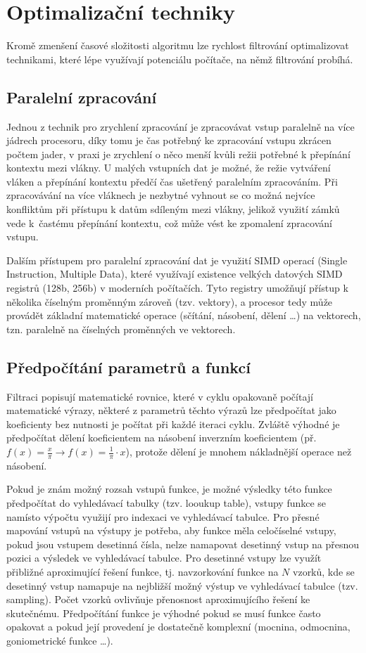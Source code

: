 \section{Optimalizační techniky}
\label{sec:design:optimalization}
Kromě zmenšení časové složitosti algoritmu lze rychlost filtrování optimalizovat technikami, které lépe využívají potenciálu počítače, na němž filtrování probíhá.

\subsection*{Paralelní zpracování}
Jednou z technik pro zrychlení zpracování je zpracovávat vstup paralelně na více jádrech procesoru, díky tomu je čas potřebný ke zpracování vstupu zkrácen počtem jader, v praxi je zrychlení o něco menší kvůli režii potřebné k přepínání kontextu mezi vlákny. U malých vstupních dat je možné, že režie vytváření vláken a přepínání kontextu předčí čas ušetřený paralelním zpracováním. Při zpracovávání na více vláknech je nezbytné vyhnout se co možná nejvíce konfliktům při přístupu k datům sdíleným mezi vlákny, jelikož využití zámků vede k~častému přepínání kontextu, což může vést ke zpomalení zpracování vstupu.

Dalším přístupem pro paralelní zpracování dat je využití SIMD operací (Single Instruction, Multiple Data), které využívají existence velkých datových SIMD registrů (128b, 256b) v moderních počítačích. Tyto registry umožňují přístup k několika číselným proměnným zároveň (tzv. vektory), a procesor tedy může provádět základní matematické operace (sčítání, násobení, dělení \dots) na vektorech, tzn. paralelně na číselných proměnných ve vektorech. 

\subsection*{Předpočítání parametrů a funkcí}
Filtraci popisují matematické rovnice, které v cyklu opakovaně počítají matematické výrazy, některé z parametrů těchto výrazů lze předpočítat jako koeficienty bez nutnosti je počítat při každé iteraci cyklu. Zvláště výhodné je předpočítat dělení koeficientem na násobení inverzním koeficientem (př. $f(x)=\frac{x}{\pi} \rightarrow f(x)=\frac{1}{\pi} \cdot x$), protože dělení je mnohem nákladnější operace než násobení. 

Pokud je znám možný rozsah vstupů funkce, je možné výsledky této funkce předpočítat do vyhledávací tabulky (tzv. looukup table), vstupy funkce se namísto výpočtu využijí pro indexaci ve vyhledávací tabulce. Pro přesné mapování vstupů na výstupy je potřeba, aby funkce měla celočíselné vstupy, pokud jsou vstupem desetinná čísla, nelze namapovat desetinný vstup na přesnou pozici a výsledek ve vyhledávací tabulce. Pro desetinné vstupy lze využít přibližné aproximující řešení funkce, tj. navzorkování funkce na $N$ vzorků, kde se desetinný vstup namapuje na nejbližší možný výstup ve vyhledávací tabulce (tzv. sampling). Počet vzorků ovlivňuje přenosnost aproximujícího řešení ke skutečnému. Předpočítání funkce je výhodné pokud se musí funkce často opakovat a pokud její provedení je dostatečně komplexní (mocnina, odmocnina, goniometrické funkce \dots).

